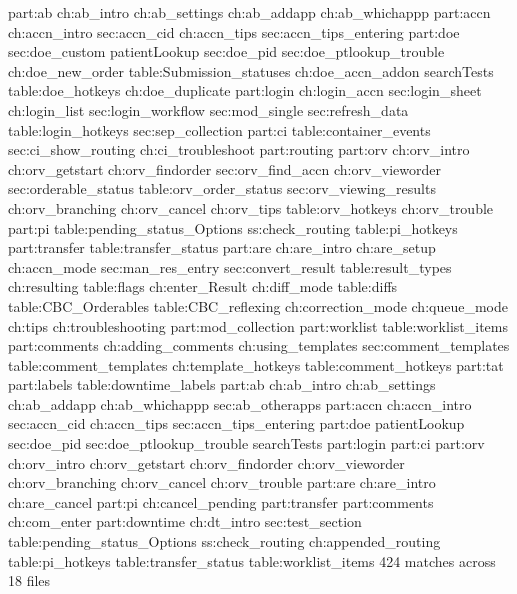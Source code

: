 part:ab
	ch:ab_intro
	ch:ab_settings
	ch:ab_addapp
	ch:ab_whichappp
part:accn
	ch:accn_intro
	sec:accn_cid
	ch:accn_tips
	sec:accn_tips_entering
part:doe
	sec:doe_custom
	patientLookup
	sec:doe_pid
	sec:doe_ptlookup_trouble
	ch:doe_new_order
	table:Submission_statuses
	ch:doe_accn_addon
	searchTests
	table:doe_hotkeys
	ch:doe_duplicate
part:login
	ch:login_accn
	sec:login_sheet
	ch:login_list
	sec:login_workflow
	sec:mod_single
	sec:refresh_data
	table:login_hotkeys
	sec:sep_collection
part:ci
	table:container_events
	sec:ci_show_routing
	ch:ci_troubleshoot
part:routing
part:orv
	ch:orv_intro
	ch:orv_getstart
	ch:orv_findorder
	sec:orv_find_accn
	ch:orv_vieworder
	sec:orderable_status
	table:orv_order_status
	sec:orv_viewing_results
	ch:orv_branching
	ch:orv_cancel
	ch:orv_tips
	table:orv_hotkeys
	ch:orv_trouble
part:pi
	table:pending_status_Options
	ss:check_routing
	table:pi_hotkeys
part:transfer
	table:transfer_status
part:are
	ch:are_intro
	ch:are_setup
	ch:accn_mode
	sec:man_res_entry
	sec:convert_result
	table:result_types
	ch:resulting
	table:flags
	ch:enter_Result
	ch:diff_mode
	table:diffs
	table:CBC_Orderables
	table:CBC_reflexing
	ch:correction_mode
	ch:queue_mode
	ch:tips
	ch:troubleshooting
part:mod_collection
part:worklist
	table:worklist_items
part:comments
	ch:adding_comments
	ch:using_templates
	sec:comment_templates
	table:comment_templates
	ch:template_hotkeys
	table:comment_hotkeys
part:tat
part:labels
	table:downtime_labels
part:ab
	ch:ab_intro
	ch:ab_settings
	ch:ab_addapp
	ch:ab_whichappp
	sec:ab_otherapps
part:accn
	ch:accn_intro
	sec:accn_cid
	ch:accn_tips
	sec:accn_tips_entering
part:doe
	patientLookup
	sec:doe_pid
	sec:doe_ptlookup_trouble
	searchTests
part:login
part:ci
part:orv
	ch:orv_intro
	ch:orv_getstart
	ch:orv_findorder
	ch:orv_vieworder
	ch:orv_branching
	ch:orv_cancel
	ch:orv_trouble
part:are
	ch:are_intro
	ch:are_cancel
part:pi
	ch:cancel_pending
part:transfer
part:comments
	ch:com_enter
part:downtime
	ch:dt_intro
	sec:test_section
	table:pending_status_Options
	ss:check_routing
	ch:appended_routing
	table:pi_hotkeys
	table:transfer_status
	table:worklist_items
	424 matches across 18 files

